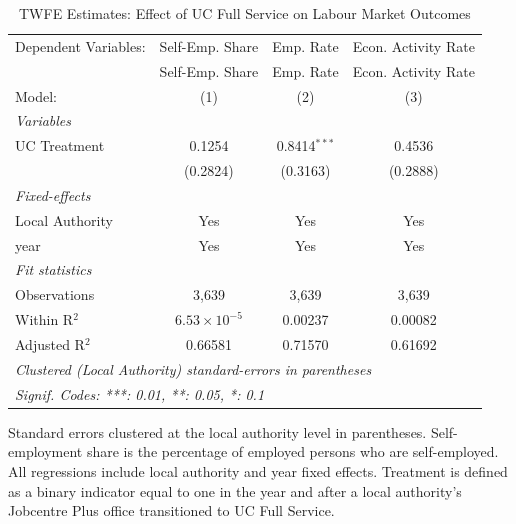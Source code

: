 
\begin{table}[htbp]
   \caption{\label{tab:twfe} TWFE Estimates: Effect of UC Full Service on Labour Market Outcomes}
   \centering
   \begin{tabular}{lccc}
      \tabularnewline \midrule \midrule
      Dependent Variables: & Self-Emp. Share       & Emp. Rate      & Econ. Activity Rate\\  
                           & Self-Emp. Share       & Emp. Rate      & Econ. Activity Rate \\   
      Model:               & (1)                   & (2)            & (3)\\  
      \midrule
      \emph{Variables}\\
      UC Treatment         & 0.1254                & 0.8414$^{***}$ & 0.4536\\   
                           & (0.2824)              & (0.3163)       & (0.2888)\\   
      \midrule
      \emph{Fixed-effects}\\
      Local Authority      & Yes                   & Yes            & Yes\\  
      year                 & Yes                   & Yes            & Yes\\  
      \midrule
      \emph{Fit statistics}\\
      Observations         & 3,639                 & 3,639          & 3,639\\  
      Within R$^2$         & $6.53\times 10^{-5}$  & 0.00237        & 0.00082\\  
      Adjusted R$^2$       & 0.66581               & 0.71570        & 0.61692\\  
      \midrule \midrule
      \multicolumn{4}{l}{\emph{Clustered (Local Authority) standard-errors in parentheses}}\\
      \multicolumn{4}{l}{\emph{Signif. Codes: ***: 0.01, **: 0.05, *: 0.1}}\\
   \end{tabular}
   
   \par \raggedright 
   Standard errors clustered at the local authority level in parentheses. Self-employment share is the percentage of employed persons who are self-employed. All regressions include local authority and year fixed effects. Treatment is defined as a binary indicator equal to one in the year and after a local authority's Jobcentre Plus office transitioned to UC Full Service.
\end{table}


